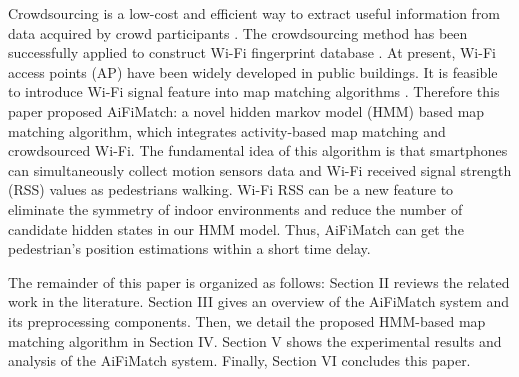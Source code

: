 \documentclass{llncs}
\begin{document}
Crowdsourcing is a low-cost and efficient way to extract useful information from data acquired by crowd participants \cite{wang2016indoor}. The crowdsourcing method has been successfully applied to construct Wi-Fi fingerprint database \cite{zhang2014robust,xiang2017tack}. At present, Wi-Fi access points (AP) have been widely developed in public buildings. It is feasible to introduce Wi-Fi signal feature into map matching algorithms \cite{newson2009hidden,seitz2010hidden}. Therefore this paper proposed AiFiMatch: a novel hidden markov model (HMM) based map matching algorithm, which integrates activity-based map matching and crowdsourced Wi-Fi. The fundamental idea of this algorithm is that smartphones can simultaneously collect motion sensors data and Wi-Fi received signal strength (RSS) values as pedestrians walking. Wi-Fi RSS can be a new feature to eliminate the symmetry of indoor environments and reduce the number of candidate hidden states in our HMM model. Thus, AiFiMatch can get the pedestrian's position estimations within a short time delay. 



The remainder of this paper is organized as follows: Section II reviews the related work in the literature. Section III gives an overview of the AiFiMatch system and its preprocessing components. Then, we detail the proposed HMM-based map matching algorithm in Section IV. Section V shows the experimental results and analysis of the AiFiMatch system. Finally, Section VI concludes this paper.
\end{document}
